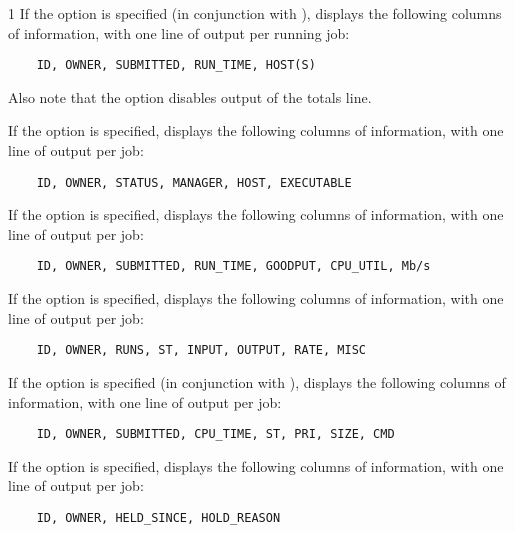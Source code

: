 \begin{ManPage}{\label{man-condor-q}}{1}
If the  option is specified (in conjunction with ),
 displays the following columns of information, with one line
of output per running job:
\begin{verbatim}
    ID, OWNER, SUBMITTED, RUN_TIME, HOST(S)
\end{verbatim}
Also note that the  option disables output of the
totals line.

If the  option is specified,  displays the
following columns of information, with one line of output per job:
\begin{verbatim}
    ID, OWNER, STATUS, MANAGER, HOST, EXECUTABLE
\end{verbatim}


If the  option is specified,  displays the
following columns of information, with one line of output per job:
\begin{verbatim}
    ID, OWNER, SUBMITTED, RUN_TIME, GOODPUT, CPU_UTIL, Mb/s
\end{verbatim}

If the  option is specified,  displays the
following columns of information, with one line of output per job:
\begin{verbatim}
    ID, OWNER, RUNS, ST, INPUT, OUTPUT, RATE, MISC
\end{verbatim}

If the  option is specified (in conjunction with ),
 displays the
following columns of information, with one line of output per job:
\begin{verbatim}
    ID, OWNER, SUBMITTED, CPU_TIME, ST, PRI, SIZE, CMD
\end{verbatim}

If the  option is specified,  displays the
following columns of information, with one line of output per job:
\begin{verbatim}
    ID, OWNER, HELD_SINCE, HOLD_REASON
\end{verbatim}


\end{ManPage}
